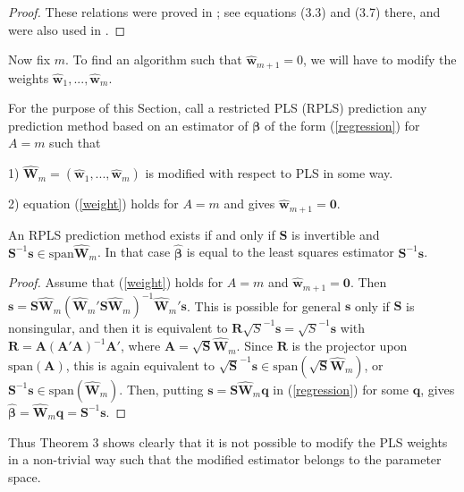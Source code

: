 \documentclass[num-refs]{wiley-article}
\begin{document}
\begin{proof}
  These relations were proved in \citet{helland1988structure}; see equations (3.3) and (3.7) there, and were also used in \citet{cook2013envelopes}.
\end{proof}

Now fix $m$. To find an algorithm such that $\widehat{\bm{w}}_{m+1}=0$, we will have to modify the weights $\widehat{\bm{w}}_1,...,\widehat{\bm{w}}_m$. 

\begin{definition}
For the purpose of this Section, call a restricted PLS (RPLS) prediction any prediction method based on an estimator of $\bm{\beta}$ of the form (\ref{regression}) for $A=m$ such that

1) $\widehat{\bm{W}}_{m}=(\widehat{\bm{w}}_1,...,\widehat{\bm{w}}_m )$ is modified with respect to PLS in some way.

2) equation (\ref{weight}) holds for $A=m$ and gives $\widehat{\bm{w}}_{m+1} = \bm{0}$.
\end{definition}

\begin{theorem}
  An RPLS prediction method exists if and only if $\bm{S}$ is invertible and $\bm{S}^{-1}\bm{s}\in\mathrm{span}\widehat{\bm{W}}_{m}$. In that case $\widehat{\bm{\beta}}$ is equal to the least squares estimator $\bm{S}^{-1}\bm{s}$.
\end{theorem}

\begin{proof}
  Assume that (\ref{weight}) holds for $A=m$ and $\widehat{\bm{w}}_{m+1}=\bm{0}$. Then $\bm{s}=\bm{S}\widehat{\bm{W}}_m(\widehat{\bm{W}}_m'\bm{S}\widehat{\bm{W}}_m)^{-1}\widehat{\bm{W}}_m'\bm{s}$. This is possible for general $\bm{s}$ only if $\bm{S}$ is nonsingular, and then it is equivalent to $\bm{R}\sqrt{S}^{-1}\bm{s}=\sqrt{S}^{-1}\bm{s}$ with $\bm{R}=\bm{A}(\bm{A}'\bm{A})^{-1}\bm{A}'$, where $\bm{A}=\sqrt{\bm{S}}\widehat{\bm{W}}_m$. Since $\bm{R}$ is the projector upon $\mathrm{span}(\bm{A})$, this is again equivalent to $\sqrt{\bm{S}}^{-1}\bm{s}\in\mathrm{span}(\sqrt{\bm{S}}\widehat{\bm{W}}_m)$, or $\bm{S}^{-1}\bm{s}\in\mathrm{span}(\widehat{\bm{W}}_m)$. Then, putting $\bm{s}=\bm{S}\widehat{\bm{W}}_m\bm{q}$ in (\ref{regression}) for some $\bm{q}$, gives $\widehat{\bm{\beta}}=\widehat{\bm{W}}_m\bm{q}=\bm{S}^{-1}\bm{s}$.
\end{proof}

Thus Theorem 3 shows clearly that it is not possible to modify the PLS weights in a non-trivial way such that the modified estimator belongs to the parameter space.
\end{document}
